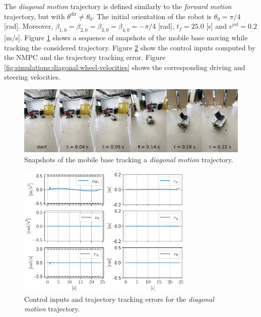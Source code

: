 The \textit{diagonal motion} trajectory is defined similarly to the \textit{forward motion} trajectory, but with $\theta^{\mathrm{dir}} \ne \theta_0$. The initial orientation of the robot is $\theta_0=\pi/4$ [rad]. Moreover, $\beta_{1,0}=\beta_{2,0}=\beta_{3,0}=\beta_{4,0}=-\pi/4$ [rad], $t_f = 25.0$ [s] and $v^{\mathrm{ref}}=0.2$ [m/s]. Figure \ref{fig:experiments:diagonal:snapshots} shows a sequence of snapshots of the mobile base moving while tracking the considered trajectory. Figure \ref{fig:simulations:diagonal:inputs-and-errors} show the control inputs computed by the NMPC and the trajectory tracking error. Figure \ref{fig:simulations:diagonal:wheel-velocities} shows the corresponding driving and steering velocities.
\begin{figure}
    \centering
    \includegraphics[width=\textwidth]{figures/SWMR/simulations/diagonal/snapshots.jpeg}
    \caption{Snapshots of the mobile base tracking a \textit{diagonal motion} trajectory.}
    \label{fig:experiments:diagonal:snapshots}
\end{figure}
\begin{figure}
    \centering
    \includegraphics[width=0.75\textwidth]{figures/SWMR/simulations/diagonal/inputs_and_errors.pdf}
    \caption{Control inputs and trajectory tracking errors for the \textit{diagonal motion} trajectory.}
    \label{fig:simulations:diagonal:inputs-and-errors}
\end{figure}

